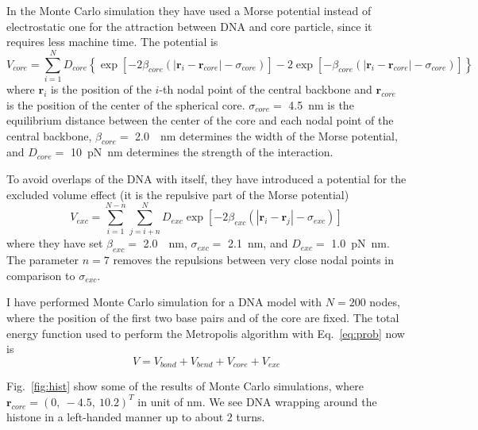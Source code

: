 \documentclass[a4paper,10pt]{article}
\begin{document}
In the Monte Carlo simulation they have used a Morse potential instead of electrostatic one for the attraction between DNA and core particle, since it requires less machine time.
The potential is
\begin{equation}\label{eq:core}
V_{core}=\sum_{i=1}^{N}D_{core}\left\{\exp\left[-2\beta_{core}\left(\left|\textbf{r}_{i}-\textbf{r}_{core}\right|-\sigma_{core}\right)\right]-2\exp\left[-\beta_{core}\left(\left|\textbf{r}_{i}-\textbf{r}_{core}\right|-\sigma_{core}\right)\right]\right\}
\end{equation}
where $\textbf{r}_i$ is the position of the $i$-th nodal point of the central backbone and $\textbf{r}_{core}$ is the position of the center of the spherical core.
$\sigma_{core}=$ \SI{4.5}{\nm} is the equilibrium distance between the center of the core and each nodal point of the central backbone, $\beta_{core}=$ \SI{2.0}{\per\nm} determines the width of the Morse potential, and $D_{core}=$ \SI{10}{\pico\newton\nano\meter} determines the strength of the interaction.

To avoid overlaps of the DNA with itself, they  have introduced a potential for the excluded volume effect (it is the repulsive part of the Morse potential)
\begin{equation}\label{eq:exc}
V_{exc}=\sum_{i=1}^{N-n}\sum_{j=i+n}^{N}D_{exc}\exp\left[-2\beta_{exc}\left(\left|\textbf{r}_{i}-\textbf{r}_{j}\right|-\sigma_{exc}\right)\right]
\end{equation}
where they have set $\beta_{exc}=$ \SI{2.0}{\per\nm}, $\sigma_{exc}=$ \SI{2.1}{\nm}, and $D_{exc}=$ \SI{1.0}{\pico\newton\nano\meter}.
The parameter $n=7$ removes the repulsions between very close nodal points in comparison to $\sigma_{exc}$.

I have performed Monte Carlo simulation for a DNA model with $N=200$ nodes, where the position of the first two base pairs and of the core are fixed.
The total energy function used to perform the Metropolis algorithm with Eq.~\ref{eq:prob} now is
\begin{equation}\label{eq:hist_energy}
V=V_{bond}+V_{bend}+V_{core}+V_{exc}
\end{equation}

Fig.~\ref{fig:hist} show some of the results of Monte Carlo simulations, where $\textbf{r}_{core}=\left(0,\ -4.5,\ 10.2\right)^T$ in unit of \si{\nm}.
We see DNA wrapping around the histone in a left-handed manner up to about $2$ turns.
\end{document}
